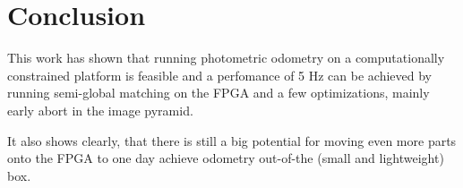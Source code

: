 \chapter{Conclusion}
\label{sec:conclusion}

This work has shown that running photometric odometry on a computationally
constrained platform is feasible and a perfomance of 5 Hz can be achieved by
running semi-global matching on the FPGA and a few optimizations, mainly early
abort in the image pyramid.

It also shows clearly, that there is still a big potential for moving even more
parts onto the FPGA to one day achieve odometry out-of-the (small and lightweight) box.
